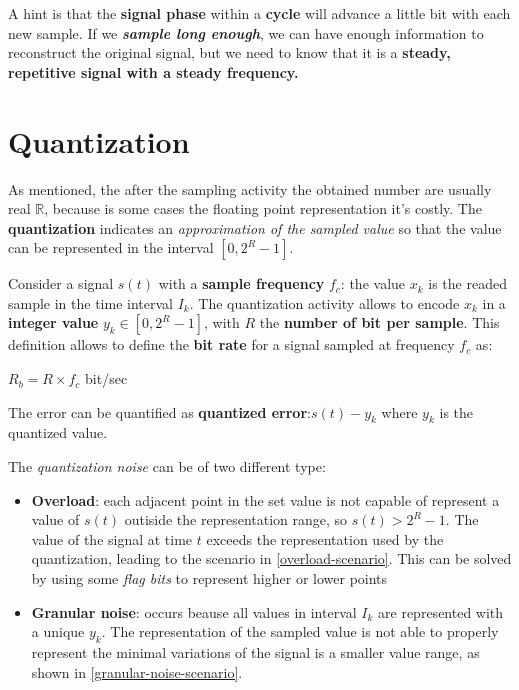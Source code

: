 \documentclass[10pt,a4paper]{report}
\theoremstyle{definition}
\begin{document}
A hint is that the \textbf{signal phase} within a \textbf{cycle} will advance a little bit with each new sample. If we \textit{\textbf{sample long enough}}, we can have enough information to reconstruct the original signal, but we need to know that it is a \textbf{steady, repetitive signal with a steady frequency.}
\section{Quantization}\label{sec:quantization}
As mentioned, the after the sampling activity the obtained number are usually real $\mathbb{R}$, because is some cases the floating point representation it's costly.
The \textbf{quantization} indicates an \textit{approximation of the sampled value} so that the value can be represented in the interval $[0,2^{R}-1]$.

Consider a signal $s(t)$ with a \textbf{sample frequency} $f_{c}$: the value $x_{k}$ is the readed sample in the time interval $I_{k}$.
The quantization activity allows to encode $x_{k}$ in a \textbf{integer value} $y_{k} \in [0, 2^{R}-1]$, with $R$ the \textbf{number of bit per sample}. This definition allows to define the \textbf{bit rate} for a signal sampled at frequency $f_{c}$ as:
\begin{center}
$R_{b} = R \times f_{c}$ bit/sec
\end{center}

The error can be quantified  as \textbf{quantized error}:$s(t)-y_{k}$ where $y_{k}$ is the quantized value.

The \textit{quantization noise} can be of two different type:
\begin{itemize}
	\item 
	\textbf{Overload}: each adjacent point in the set value is not capable of represent a value of $s(t)$ outiside the representation range, so $s(t) > 2^{R}-1$.  The value of the signal at time $t$ exceeds the representation used by the quantization, leading to the scenario in \ref{overload-scenario}. This can be solved by using some \textit{flag bits} to represent higher or lower points
	\item 
	\textbf{Granular noise}: occurs beause all values in interval $I_{k}$ are represented with a unique $y_{k}$. The representation of the sampled value is not able to properly represent the minimal variations of the signal is a smaller value range, as shown in \ref{granular-noise-scenario}.
\end{itemize}
\end{document}
